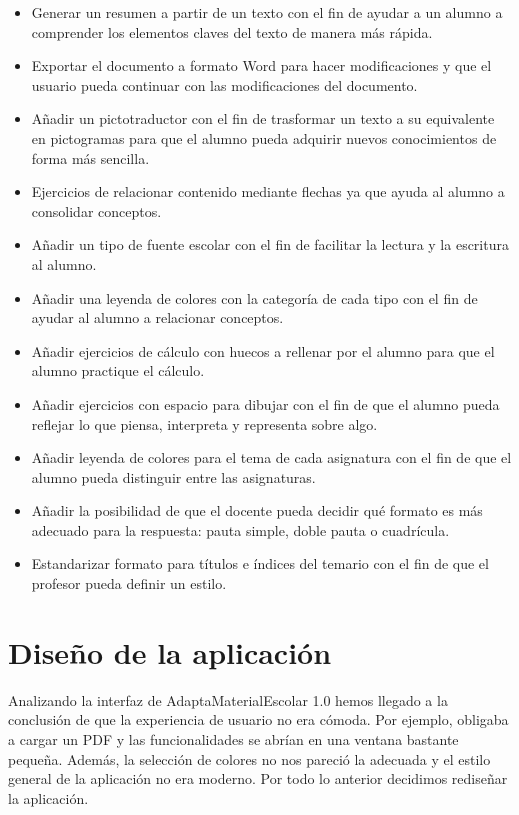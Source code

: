 \begin{itemize}
  \item Generar un resumen a partir de un texto con el fin de ayudar a un alumno a comprender los elementos claves del texto de manera más rápida.
  \item Exportar el documento a formato Word para hacer modificaciones y que el usuario pueda continuar con las modificaciones del documento.
  \item Añadir un pictotraductor con el fin de trasformar un texto a su equivalente en pictogramas para que el alumno pueda adquirir nuevos conocimientos de forma más sencilla.
  \item Ejercicios de relacionar contenido mediante flechas ya que ayuda al alumno a consolidar conceptos.
  \item Añadir un tipo de fuente escolar con el fin de facilitar la lectura y la escritura al alumno.
  \item Añadir una leyenda de colores con la categoría de cada tipo con el fin de ayudar al alumno a relacionar conceptos.
  \item Añadir ejercicios de cálculo con huecos a rellenar por el alumno para que el alumno practique el cálculo.
  \item Añadir ejercicios con espacio para dibujar con el fin de que el alumno pueda reflejar lo que piensa, interpreta y representa sobre algo.
  \item Añadir leyenda de colores para el tema de cada asignatura con el fin de que el alumno pueda distinguir entre las asignaturas.
  \item Añadir la posibilidad de que el docente pueda decidir qué formato es más adecuado para la respuesta: pauta simple, doble pauta o cuadrícula.
  \item Estandarizar formato para títulos e índices del temario con el fin de que el profesor pueda definir un estilo.

\end{itemize}

\section{Diseño de la aplicación}
\label{disenyoDeLaAplicacion}
Analizando la interfaz de AdaptaMaterialEscolar 1.0 hemos llegado a la conclusión de que la experiencia de usuario no era cómoda. Por ejemplo, obligaba a cargar un PDF y las funcionalidades se abrían en una ventana bastante pequeña. Además, la selección de colores no nos pareció la adecuada y el estilo general de la aplicación no era moderno. Por todo lo anterior decidimos rediseñar la aplicación.

